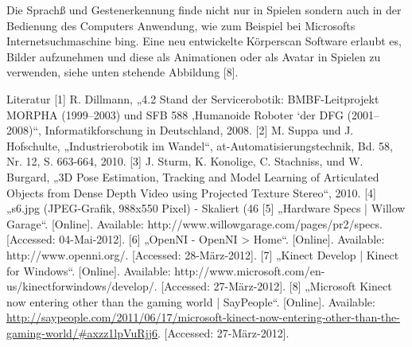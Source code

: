 Die Sprachß und Gestenerkennung finde nicht nur in Spielen sondern auch in der Bedienung des Computers Anwendung, wie zum Beispiel bei Microsofts Internetsuchmaschine bing. Eine neu entwickelte Körperscan Software erlaubt es, Bilder aufzunehmen und diese als Animationen oder als Avatar in Spielen zu verwenden, siehe unten stehende Abbildung [8].



Literatur
[1]	 R. Dillmann, „4.2 Stand der Servicerobotik: BMBF-Leitprojekt MORPHA (1999–2003) und SFB 588 ‚Humanoide Roboter ‘der DFG (2001–2008)“, Informatikforschung in Deutschland, 2008.
[2]	 M. Suppa und J. Hofschulte, „Industrierobotik im Wandel“, at-Automatisierungstechnik, Bd. 58, Nr. 12, S. 663-664, 2010.
[3]	 J. Sturm, K. Konolige, C. Stachniss, und W. Burgard, „3D Pose Estimation, Tracking and Model Learning of Articulated Objects from Dense Depth Video using Projected Texture Stereo“, 2010.
[4]	„s6.jpg (JPEG-Grafik, 988x550 Pixel) - Skaliert (46%
[5]	„Hardware Specs | Willow Garage“. [Online]. Available: http://www.willowgarage.com/pages/pr2/specs. [Accessed: 04-Mai-2012].
[6]	„OpenNI - OpenNI > Home“. [Online]. Available: http://www.openni.org/. [Accessed: 28-März-2012].
[7]	„Kinect Develop | Kinect for Windows“. [Online]. Available: http://www.microsoft.com/en-us/kinectforwindows/develop/. [Accessed: 27-März-2012].
[8]	„Microsoft Kinect now entering other than the gaming world | SayPeople“. [Online]. Available: \url{http://saypeople.com/2011/06/17/microsoft-kinect-now-entering-other-than-the-gaming-world/#axzz1lpVuRjj6}. [Accessed: 27-März-2012].

